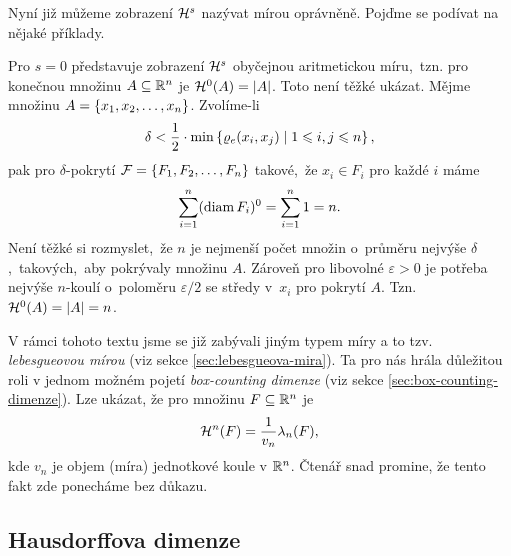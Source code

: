 Nyní již můžeme zobrazení $\mathcal{H}^s$ nazývat mírou oprávněně. Pojďme se podívat na nějaké příklady.
\begin{example}
    Pro $s=0$ představuje zobrazení $\mathcal{H}^s$ obyčejnou aritmetickou míru,~tzn. pro konečnou množinu $A\subseteq\mathbb{R}^n$ je $\mathcal{H}^0(A)=|A|$. Toto není těžké ukázat. Mějme množinu $A=\left\{x_1,x_2,\ldots,x_n\right\}$. Zvolíme-li
    \[\delta<\dfrac{1}{2}\cdot\min\left\{\varrho_e(x_i,x_j)\mid 1\leqslant i,j\leqslant n\right\},\]
    pak pro $\delta$-pokrytí $\mathcal{F}=\left\{F_1,F_2,\ldots,F_n\right\}$ takové,~že $x_i\in F_i$ pro každé $i$ máme
    \[\sum_{i=1}^{n}(\operatorname{diam}{F_i})^0=\sum_{i=1}^{n}1=n.\]
    Není těžké si rozmyslet,~že $n$ je nejmenší počet množin o~průměru nejvýše $\delta$,~takových,~aby pokrývaly množinu $A$. Zároveň pro libovolné $\varepsilon>0$ je potřeba nejvýše $n$-koulí o~poloměru $\varepsilon/2$ se středy v~$x_i$ pro pokrytí $A$. Tzn.~$\mathcal{H}^0(A)=|A|=n$.
\end{example}

V rámci tohoto textu jsme se již zabývali jiným typem míry a to tzv. \emph{lebesgueovou mírou} (viz sekce \ref{sec:lebesgueova-mira}). Ta pro nás hrála důležitou roli v jednom možném pojetí \emph{box-counting dimenze} (viz sekce \ref{sec:box-counting-dimenze}). Lze ukázat, že pro množinu $F\subseteq\mathbb{R}^n$ je
\[\mathcal{H}^n(F)=\dfrac{1}{v_n}\lambda_n(F),\]
kde $v_n$ je objem (míra) jednotkové koule v $\mathbb{R}^n$. Čtenář snad promine, že tento fakt zde ponecháme bez důkazu. \citep[str. 45]{Falconer2014}

\subsection{Hausdorffova dimenze}\label{subsec:hausdorffova-dimenze}

